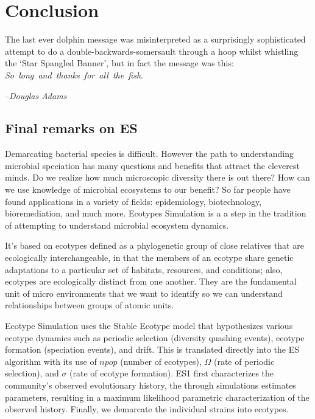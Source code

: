 \gobbletocpage
\chapter{Conclusion}
\restoretocpage

\begin{shadequote}
The last ever dolphin message was misinterpreted as a surprisingly sophisticated attempt to do a double-backwards-somersault through a hoop whilst whistling the `Star Spangled Banner', but in fact the message was this: \mbox{\emph{So long and thanks for all the fish}}. \par--\emph{Douglas Adams}
\end{shadequote}


\section{Final remarks on ES}

Demarcating bacterial species is difficult.
However the path to understanding microbial speciation has many questions and benefits that attract the cleverest minds.
Do we realize how much microscopic diversity there is out there?
How can we use knowledge of microbial ecosystems to our benefit?
So far people have found applications in a variety of fields: epidemiology, biotechnology, bioremediation, and much more.
Ecotypes Simulation is a a step in the tradition of attempting to understand microbial ecosystem dynamics.

It's based on ecotypes defined as a phylogenetic group of close relatives that are ecologically interchangeable, in that the members of an ecotype share genetic adaptations to a particular set of habitats, resources, and conditions; also, ecotypes are ecologically distinct from one another.
They are the fundamental unit of micro environments that we want to identify so we can understand relationships between groups of atomic units.

Ecotype Simulation uses the Stable Ecotype model that hypothesizes various ecotype dynamics such as periodic selection (diversity quashing events), ecotype formation (speciation events), and drift.
This is translated directly into the ES algorithm with its use of $npop$ (number of ecotypes), $\Omega$ (rate of periodic selection), and $\sigma$ (rate of ecotype formation).
ES1 first characterizes the community's observed evolutionary history, the through simulations estimates parameters, resulting in a maximum likelihood parametric characterization of the observed history.
Finally, we demarcate the individual strains into ecotypes.

